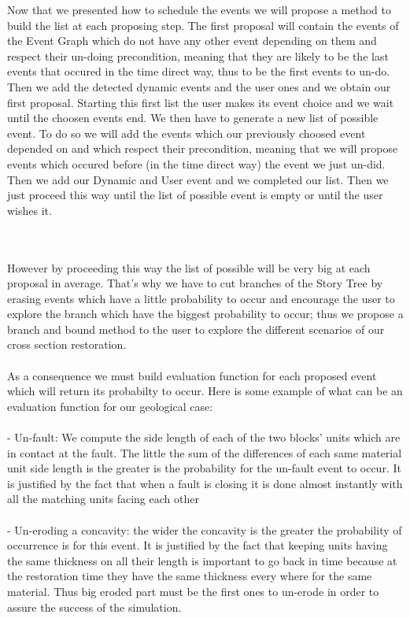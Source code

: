 \documentclass[12pt, a4paper]{report} %
\begin{document}
Now that we presented how to schedule the events we will propose a method to build the list  at each proposing step. The first proposal will contain the events of the Event Graph which do not have any other event depending on them and respect their un-doing precondition, meaning that they are likely to be the last events that occured in the time direct way, thus to be the first events to un-do. Then we add the detected dynamic events and the user ones and we obtain our first proposal. Starting this first list the user makes its event choice and we wait until the choosen events end. We then have to generate a new list of possible event. To do so we will add the events which our previously choosed event depended on and which respect their precondition, meaning that we will propose events which occured before (in the time direct way) the event we just un-did. Then we add our Dynamic and User event and we completed our list. Then we just proceed this way until the list of possible event is empty or until the user wishes it.\\\\\

However by proceeding this way the list of possible will be very big at each proposal in average. That's why we have to cut branches of the Story Tree by erasing events which have a little probability to occur and encourage the user to explore the branch which have the biggest probability to occur; thus we propose a branch and bound method to the user to explore the different scenarios of our cross section restoration.\\\\

As a consequence we must build evaluation function for each proposed event which will return its probabilty to occur. Here is some example of what can be an evaluation function for our geological case:\\\\

 - Un-fault: We compute the side length of each of the two blocks' units which are in contact at the fault. The little the sum of the differences of each same material unit side length is the greater is the probability for the un-fault event to occur. It is justified by the fact that when a fault is closing it is done almost instantly with all the matching units facing each other\\\\
 
 - Un-eroding a concavity: the wider the concavity is the greater the probability of occurrence is for this event. It is justified by the fact that keeping units having the same thickness on all their length is important to go back in time because at the restoration time they have the same thickness every where for the same material. Thus big eroded part must be the first ones to un-erode in order to assure the success of the simulation.\\\\
 
\end{document}
